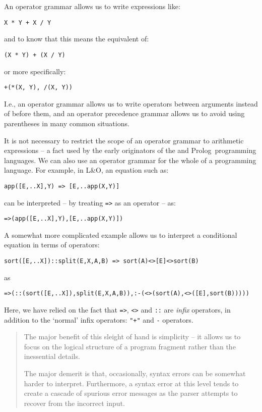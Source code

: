 An operator grammar allows us to write expressions like:
\begin{verbatim}
X * Y + X / Y
\end{verbatim}
and to know that this means the equivalent of:
\begin{verbatim}
(X * Y) + (X / Y)
\end{verbatim}
or more specifically:
\begin{verbatim}
+(*(X, Y), /(X, Y))
\end{verbatim}
I.e., an operator grammar allows us to write operators between arguments instead of before them, and an operator precedence grammar allows us to avoid using parentheses in many common situations.

It is not necessary to restrict the scope of an operator grammar to arithmetic expressions -- a fact used by the early originators of the  and Prolog\ programming languages. We can also use an operator grammar for the whole of a programming language. For example, in L&O, an equation such as:
\begin{verbatim}
app([E,..X],Y) => [E,..app(X,Y)]
\end{verbatim}
can be interpreted -- by treating \verb+=>+ as an operator -- as:
\begin{verbatim}
=>(app([E,..X],Y),[E,..app(X,Y)])
\end{verbatim}
A somewhat more complicated example allows us to interpret a conditional equation in terms of operators:
\begin{verbatim}
sort([E,..X])::split(E,X,A,B) => sort(A)<>[E]<>sort(B) 
\end{verbatim}
as
\begin{verbatim}
=>(::(sort([E,..X]),split(E,X,A,B)),:-(<>(sort(A),<>([E],sort(B)))))

\end{verbatim}
Here, we have relied on the fact that \verb+=>+, \verb+<>+ and \verb+::+ are \emph{infix} operators, in addition to the `normal' infix operators: \verb!"+"! and \verb+-+ operators. 

\begin{quote}
The major benefit of this sleight of hand is simplicity -- it allows us to focus on the logical structure of a program fragment rather than the inessential details.

The major demerit is that, occasionally, syntax errors can be somewhat harder to interpret. Furthermore, a syntax error at this level tends to create a cascade of spurious error messages as the parser attempts to recover from the incorrect input.
\end{quote}

